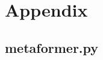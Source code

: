 \chapter{Appendix}

% 


\newpage
\section*{metaformer.py} \label{appendix:programTest}
    \inputminted[firstline=2, lastline=12]{python}{./../physics-code/models/metaformer.py}
